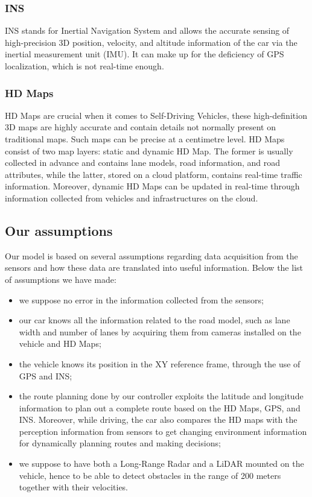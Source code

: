 \subsubsection{INS}
INS stands for Inertial Navigation System and allows the accurate sensing of high-precision 3D position, velocity, and altitude information of the car via the inertial measurement unit (IMU).
It can make up for the deficiency of GPS localization, which is not real-time enough.

\subsubsection{HD Maps}
HD Maps are crucial when it comes to Self-Driving Vehicles, these high-definition 3D maps are highly accurate and contain details not normally present on traditional maps. Such maps can be precise at a centimetre level.
HD Maps consist of two map layers: static and dynamic HD Map.
The former is usually collected in advance and contains lane models, road information, and road attributes, while the latter, stored on a cloud platform, contains real-time traffic information. Moreover, dynamic HD Maps can be updated in real-time through information collected from vehicles and infrastructures on the cloud.

\subsection{Our assumptions}

Our model is based on several assumptions regarding data acquisition from the sensors and how these data are translated into useful information. Below the list of assumptions we have made:
\begin{itemize}
    \item we suppose no error in the information collected from the sensors;
    \item our car knows all the information related to the road model, such as lane width and number of lanes by acquiring them from cameras installed on the vehicle and HD Maps;
    \item the vehicle knows its position in the XY reference frame, through the use of GPS and INS;
    \item the route planning done by our controller exploits the latitude and longitude information to plan out a complete route based on the HD Maps, GPS, and INS. Moreover, while driving, the car also compares the HD maps with the perception information from sensors to get changing environment information for dynamically planning routes and making decisions;
    \item we suppose to have both a Long-Range Radar and a LiDAR mounted on the vehicle, hence to be able to detect obstacles in the range of 200 meters together with their velocities.
\end{itemize}

